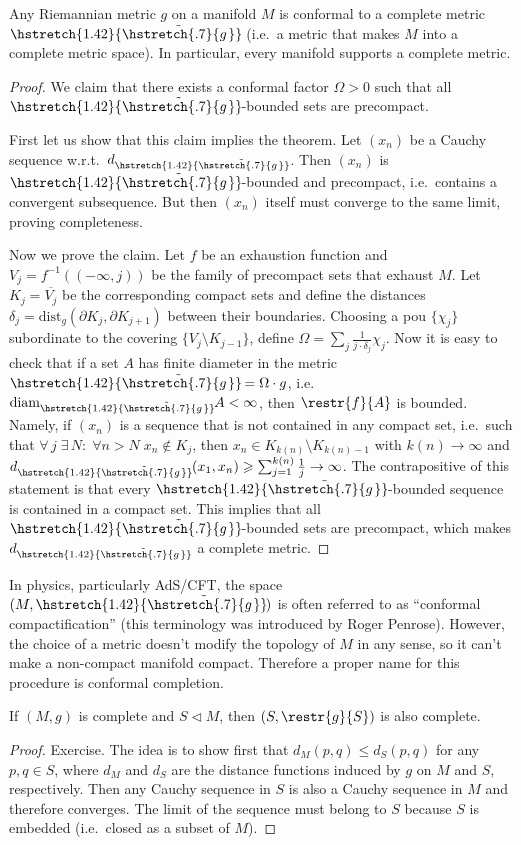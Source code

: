 \documentclass[english,letterpaper]{article}%
\numberwithin{equation}{section}
\numberwithin{figure}{section}
\numberwithin{table}{section}
\theoremstyle{definition}
\theoremstyle{definition}
\theoremstyle{definition}
\theoremstyle{plain}
\theoremstyle{plain}
\theoremstyle{plain}
\theoremstyle{plain}
\theoremstyle{remark}
\theoremstyle{remark}
\renewcommand{\geq}{\geqslant}
\renewcommand{\leq}{\leqslant}
\newcommand{\sub}{\vartriangleleft}
\newcommand\wt[1]{\hstretch{1.42}{\tilde{\hstretch{.7}{#1\mkern2mu}}}\mkern-2mu}
\begin{document}
\begin{thm}
    Any Riemannian metric $g$ on a manifold $M$ is conformal to a complete metric $\wt{g}$ (i.e.\ a metric that makes $M$ into a complete metric space). In particular, every manifold supports a complete metric.
\end{thm}
\begin{proof}
    We claim that there exists a conformal factor $\Omega>0$ such that all $\wt{g}$-bounded sets are precompact.

    First let us show that this claim implies the theorem. Let $(x_n)$ be a Cauchy sequence w.r.t.\ $d_{\wt{g}}$. Then $(x_n)$ is $\wt{g}$-bounded and precompact, i.e.\ contains a convergent subsequence. But then $(x_n)$ itself must converge to the same limit, proving completeness.

    Now we prove the claim. Let $f$ be an exhaustion function and $V_j=f^{-1}((-\infty,j))$ be the family of precompact sets that exhaust $M$. Let $K_j=\overline{V_j}$ be the corresponding compact sets and define the distances $\delta_j=\mathrm{dist}_g(\partial K_j,\partial K_{j+1})$ between their boundaries. Choosing a \gls{pou} $\{\chi_j\}$ subordinate to the covering $\{V_{j}\setminus K_{j-1}\}$, define $\Omega=\sum_j \frac{1}{j\cdot \delta_j} \chi_j$. Now it is easy to check that if a set $A$ has finite diameter in the metric $\wt{g}=\Omega\cdot g$, i.e.\ $\mathrm{diam}_{\wt{g}} A<\infty$, then $\restr{f}{A}$ is bounded. Namely, if $(x_n)$ is a sequence that is not contained in any compact set, i.e.\ such that $\forall\,j \;\exists\, N:\;\forall n>N \;x_n\notin K_j$, then $x_n\in K_{k(n)}\setminus K_{k(n)-1}$ with $k(n)\to\infty$ and  $d_{\wt{g}}(x_1,x_n)\geq\sum_{j=1}^{k(n)} \frac{1}{j}\to\infty$. The contrapositive of this statement is that every $\wt{g}$-bounded sequence is contained in a compact set. This implies that all $\wt{g}$-bounded sets are precompact, which makes $d_{\wt{g}}$ a complete metric.
\end{proof}
\begin{rem}
    In physics, particularly AdS/CFT, the space $(M,\wt{g})$ is often referred to as ``conformal compactification'' (this terminology was introduced by Roger Penrose). However, the choice of a metric doesn't modify the topology of $M$ in any sense, so it can't make a non-compact manifold compact. Therefore a proper name for this procedure is conformal completion.
\end{rem}

\begin{prop}
    If $(M,g)$ is complete and $S\sub M$, then $(S,\restr{g}{S})$ is also complete.
\end{prop}
\begin{proof}
    Exercise. The idea is to show first that $d_M(p,q)\leq d_S(p,q)$ for any $p,q\in S$, where $d_M$ and $d_S$ are the distance functions induced by $g$ on $M$ and $S$, respectively. Then any Cauchy sequence in $S$ is also a Cauchy sequence in $M$ and therefore converges. The limit of the sequence must belong to $S$ because $S$ is embedded (i.e.\ closed as a subset of $M$).
\end{proof}
\end{document}
